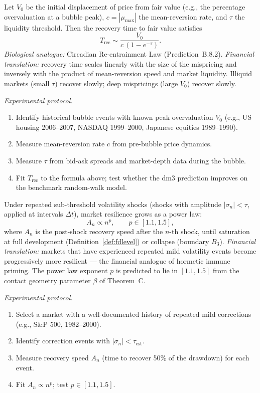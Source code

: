 \begin{prediction}
\label{pred:market2}
Let $V_0$ be the initial displacement of price from fair value
(e.g., the percentage overvaluation at a bubble peak),
$c = |\mu_{\max}|$ the mean-reversion rate, and $\tau$ the
liquidity threshold. Then the recovery time to fair value
satisfies
\[
  T_{\mathrm{rec}} \sim \frac{V_0}{c\,(1 - e^{-\tau})}.
\]
\textit{Biological analogue:} Circadian Re-entrainment Law
(Prediction~B.8.2). \textit{Financial translation:} recovery
time scales linearly with the size of the mispricing and
inversely with the product of mean-reversion speed and
market liquidity. Illiquid markets (small $\tau$) recover
slowly; deep mispricings (large $V_0$) recover slowly.

\textit{Experimental protocol.}
\begin{enumerate}[label=(\arabic*)]
  \item Identify historical bubble events with known peak
    overvaluation $V_0$ (e.g., US housing 2006--2007,
    NASDAQ 1999--2000, Japanese equities 1989--1990).
  \item Measure mean-reversion rate $c$ from pre-bubble
    price dynamics.
  \item Measure $\tau$ from bid-ask spreads and market-depth
    data during the bubble.
  \item Fit $T_{\mathrm{rec}}$ to the formula above; test
    whether the dm3 prediction improves on the benchmark
    random-walk model.
\end{enumerate}
\end{prediction}

\begin{prediction}
\label{pred:market3}
Under repeated sub-threshold volatility shocks (shocks with
amplitude $|\sigma_n| < \tau$, applied at intervals $\Delta t$),
market resilience grows as a power law:
\[
  A_n \propto n^p, \qquad p \in [1.1, 1.5],
\]
where $A_n$ is the post-shock recovery speed after the $n$-th
shock, until saturation at full development
(Definition~\ref{def:fdlevel}) or collapse (boundary $B_3$).
\textit{Financial translation:} markets that have experienced
repeated mild volatility events become progressively more
resilient --- the financial analogue of hormetic immune priming.
The power law exponent $p$ is predicted to lie in $[1.1, 1.5]$
from the contact geometry parameter $\beta$ of Theorem~C.

\textit{Experimental protocol.}
\begin{enumerate}[label=(\arabic*)]
  \item Select a market with a well-documented history of
    repeated mild corrections (e.g., S\&P 500, 1982--2000).
  \item Identify correction events with $|\sigma_n| < \tau_{\mathrm{est}}$.
  \item Measure recovery speed $A_n$ (time to recover 50\%
    of the drawdown) for each event.
  \item Fit $A_n \propto n^p$; test $p \in [1.1, 1.5]$.
\end{enumerate}
\end{prediction}

